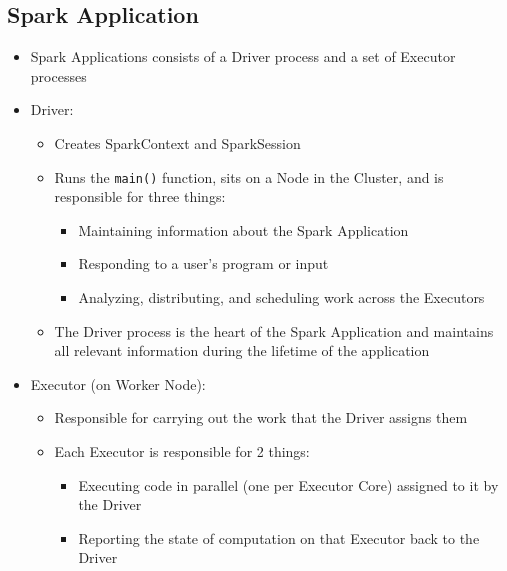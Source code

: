 \documentclass[11pt]{scrartcl}
\begin{document}
\subsection{Spark Application}
\begin{itemize}
	\item Spark Applications consists of a Driver process and a set of Executor processes
	\item Driver:
	\begin{itemize}
		\item Creates SparkContext and SparkSession
		\item Runs the \texttt{main()} function, sits on a Node in the Cluster, and is responsible for three things:
		\begin{itemize}
			\item Maintaining information about the Spark Application
			\item Responding to a user’s program or input
			\item Analyzing, distributing, and scheduling work across the Executors
		\end{itemize}
	\item The Driver process is the heart of the Spark Application and maintains all relevant information during the lifetime of the application
	\end{itemize}
	\item Executor (on Worker Node):
	\begin{itemize}
		\item Responsible for carrying out the work that the Driver assigns them
		\item Each Executor is responsible for 2 things:
		\begin{itemize}
			\item Executing code in parallel (one per Executor Core) assigned to it by the Driver
			\item Reporting the state of computation on that Executor back to the Driver
		\end{itemize}
	\end{itemize}
\end{itemize}
\end{document}
